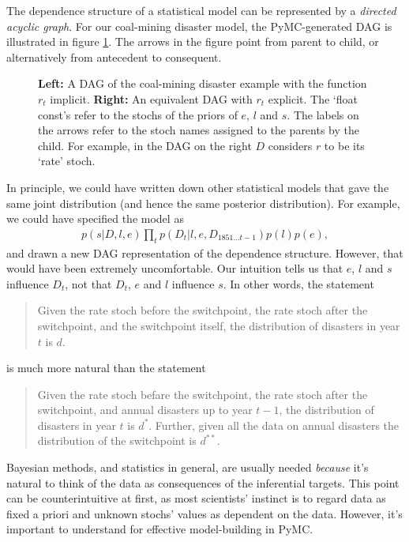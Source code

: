 \documentclass[]{book}
\begin{document}
The dependence structure of a statistical model can be represented by a \emph{directed acyclic graph}. For our coal-mining disaster model, the PyMC-generated DAG is illustrated in figure \ref{fig:disaster_dag}. The arrows in the figure point from parent to child, or alternatively from antecedent to consequent.

\begin{figure}[hhhhhhhhhhh]
\begin{center}
\caption{\textbf{Left:} A DAG of the coal-mining disaster example with the function $r_t$ implicit. \textbf{Right:} An equivalent DAG with $r_t$ explicit. The `float const's refer to the stochs of the priors of $e$, $l$ and $s$. The labels on the arrows refer to the stoch names assigned to the parents by the child. For example, in the DAG on the right $D$ considers $r$ to be its `rate' stoch.
}
\label{fig:disaster_dag}
\end{center}
\end{figure}

In principle, we could have written down other statistical models that gave the same joint distribution (and hence the same posterior distribution). For example, we could have specified the model as
\begin{eqnarray*}
p(s|D,l,e)\prod_tp(D_t|l,e,D_{1851\ldots t-1})p(l)p(e),
\end{eqnarray*}
and drawn a new DAG representation of the dependence structure. However, that would have been extremely uncomfortable. Our intuition tells us that $e$, $l$ and $s$ influence $D_t$, not that $D_t$, $e$ and $l$ influence $s$. In other words, the statement
\begin{quote}
Given the rate stoch before the switchpoint, the rate stoch after the switchpoint, and the switchpoint itself, the distribution of disasters in year $t$ is $d$.
\end{quote}
is much more natural than the statement
\begin{quote}
Given the rate stoch befare the switchpoint, the rate stoch after the switchpoint, and annual disasters up to year $t-1$, the distribution of disasters in year $t$ is $d^*$. Further, given all the data on annual disasters the distribution of the switchpoint is $d^{**}$.
\end{quote}

Bayesian methods, and statistics in general, are usually needed \emph{because} it's natural to think of the data as consequences of the inferential targets. This point can be counterintuitive at first, as most scientists' instinct is to regard data as fixed a priori and unknown stochs' values as dependent on the data. However, it's important to understand for effective model-building in PyMC.
\end{document}
